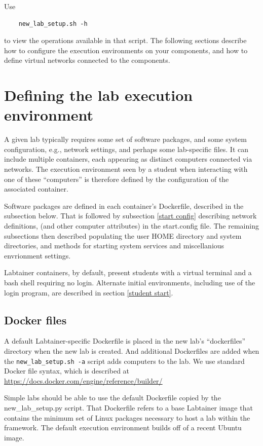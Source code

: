 \documentclass[12pt]{article}
\begin{document}
Use 
\begin{verbatim}
    new_lab_setup.sh -h
\end{verbatim}
\noindent to view the operations available in that script.
The following sections describe how to configure the execution environments on your components,
and how to define virtual networks connected to the components.

\section {Defining the lab execution environment}
\label{execution environment}
A given lab typically requires some set of software packages, and some
system configuration, e.g., network settings, and perhaps some lab-specific
files.  It can include multiple containers, each appearing as distinct
computers connected via networks.  The execution environment seen by a
student when interacting with one of these ``computers'' is therefore defined
by the configuration of the associated container. 

Software packages are defined in each container's Dockerfile, described in 
the subsection below. That is followed by subsection \ref{start config} describing network definitions,
(and other computer attributes) in the start.config file.  The remaining subsections then
described populating the user HOME directory and system directories, and methods for starting 
system services and miscellanious envrionment settings. 

Labtainer containers, by default, present students with a virtual terminal and a bash
shell requiring no login.  Alternate initial environments, including use of the login program, are
described in section \ref{student start}.

\subsection {Docker files}
A default Labtainer-specific Dockerfile is placed in the new lab's ``dockerfiles'' 
directory when the new lab is created.  And additional Dockerfiles are added when the
{\tt new\_lab\_setup.sh -a} script adds computers to the lab. We use standard Docker file syntax, which is described at 
\url{https://docs.docker.com/engine/reference/builder/}

Simple labs should be able to use the default Dockerfile copied by the 
new\_lab\_setup.py script.  That Dockerfile refers to a base Labtainer
image that contains the minimum set of Linux packages necessary to 
host a lab within the framework.  The default
execution environment builds off of a recent Ubuntu image.
\end{document}
